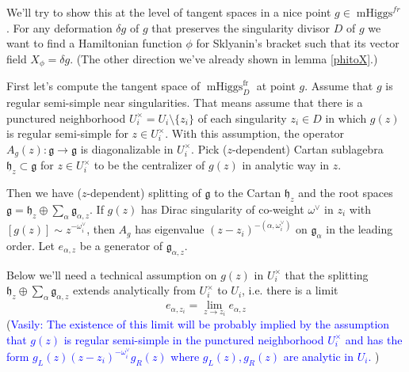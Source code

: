 \documentclass[11pt, oneside, reqno]{amsart}
\theoremstyle{definition} \newtheorem{definition}{Definition}[section]
\theoremstyle{definition} \newtheorem{remark}[definition]{Remark}
\theoremstyle{definition} \newtheorem{remarks}[definition]{Remarks}
\theoremstyle{definition} \newtheorem{question}[definition]{Question}
\theoremstyle{definition} \newtheorem*{note}{Note}
\theoremstyle{definition} \newtheorem{example}[definition]{Example}
\theoremstyle{definition} \newtheorem{examples}[definition]{Examples}
\renewcommand{\gg}{\mathfrak{g}}
\DeclareMathOperator{\mhiggs}{mHiggs}
\newcommand{\fr}{\mathrm{fr}}
\newcommand{\vasily}[1]{(\textcolor{blue}{Vasily: #1})}
\begin{document}
We'll try to show this at the level of tangent spaces in a nice point $g \in \mhiggs^{fr}$.  For any deformation $\delta g $ of $g$ that
preserves the singularity divisor $D$ of $g$ we want to find a Hamiltonian
function $\phi$ for Sklyanin's bracket such that its vector field
$X_\phi = \delta g$.  (The other direction we've already shown in lemma \ref{phitoX}.)


First let's compute the tangent space of $\mhiggs_{D}^{\fr}$ at point $g$.
Assume that $g$ is regular semi-simple near singularities. That means assume
that there is a punctured neighborhood $U_i^{\times} = U_{i} \setminus \{z_i \}$ of each singularity $z_i \in D $ in which $g(z)$ is regular semi-simple for $z \in U_{i}^{\times}$. 
With this assumption, the operator $A_{g}(z): \gg \to \gg$ is diagonalizable in $U_{i}^{\times}$.
\newcommand{\hh}{\mathfrak{h}}
Pick ($z$-dependent) Cartan sublagebra $\hh_{z} \subset \gg$  for $z \in U_{i}^{\times}$
to be the centralizer of $g(z)$ in analytic way in $z$. 

Then we have ($z$-dependent) splitting of $\gg$ to the Cartan $\hh_z$ and the root spaces 
$\gg = \hh_{z} \oplus \sum_{\alpha} \gg_{\alpha,z}$. 
If $g(z)$ has Dirac singularity of co-weight $\omega^{\vee}$ in $z_i$ with $[g(z) ] \sim z^{-\omega_i^{\vee}}$, then  $A_{g}$ has eigenvalue $ (z - z_i)^{- (\alpha, \omega^{\vee}_{i})}$ on $\gg_{\alpha}$
in the leading order. Let $e_{\alpha, z}$ be a generator of $\gg_{\alpha, z}$.

Below we'll need a technical assumption on $g(z)$ in $U_{i}^{\times}$ that the splitting
$\hh_{z} \oplus \sum_{\alpha} \gg_{\alpha,z}$ extends analytically from $U_{i}^{\times}$ to $U_{i}$,
i.e. there is a limit 
 \[ e_{\alpha, z_i} = \lim_{z \to z_i} e_{\alpha, z}\] 
\vasily{The existence of this limit will be probably implied by the
  assumption that $g(z)$ is regular semi-simple in the punctured
  neighborhood $U_{i}^{\times}$ and has the form $ g_L(z) (z-z_i)^{-\omega_{i}^{\vee}} g_{R}(z)$
  where $g_{L}(z), g_{R}(z)$ are analytic in $U_i$. }
\end{document}
